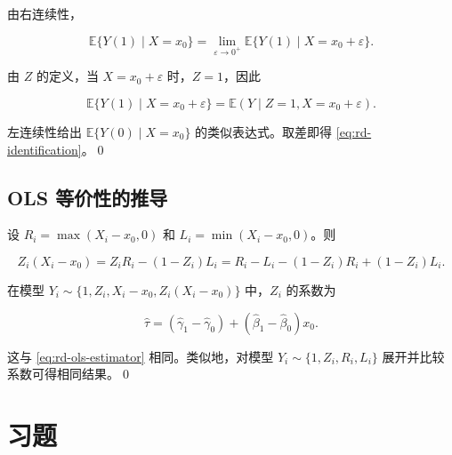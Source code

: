 由右连续性，

\begin{equation}
\mathbb{E}\{Y(1) \mid X=x_0\} = \lim_{\varepsilon \to 0^+} \mathbb{E}\{Y(1) \mid X=x_0+\varepsilon\}.
\tag{20.15}
\label{eq:rd-proof-right}
\end{equation}

由 $Z$ 的定义，当 $X=x_0+\varepsilon$ 时，$Z=1$，因此

\begin{equation}
\mathbb{E}\{Y(1) \mid X=x_0+\varepsilon\} = \mathbb{E}(Y \mid Z=1, X=x_0+\varepsilon).
\tag{20.16}
\label{eq:rd-proof-z}
\end{equation}

左连续性给出 $\mathbb{E}\{Y(0) \mid X=x_0\}$ 的类似表达式。取差即得 \cref{eq:rd-identification}。\qed

\subsection{OLS 等价性的推导}\label{sec:appendix-20-ols-equivalence}

设 $R_i = \max(X_i - x_0, 0)$ 和 $L_i = \min(X_i - x_0, 0)$。则

\begin{equation}
Z_i(X_i - x_0) = Z_i R_i - (1-Z_i)L_i = R_i - L_i - (1-Z_i)R_i + (1-Z_i)L_i .
\tag{20.17}
\label{eq:rd-ols-expand}
\end{equation}

在模型 $Y_i \sim \{1, Z_i, X_i-x_0, Z_i(X_i-x_0)\}$ 中，$Z_i$ 的系数为

\begin{equation}
\hat{\tau} = (\hat{\gamma}_1 - \hat{\gamma}_0) + (\hat{\beta}_1 - \hat{\beta}_0)x_0 .
\tag{20.18}
\label{eq:rd-ols-tau}
\end{equation}

这与 \cref{eq:rd-ols-estimator} 相同。类似地，对模型 $Y_i \sim \{1, Z_i, R_i, L_i\}$ 展开并比较系数可得相同结果。\qed


\section{习题}\label{sec:20-homework}

